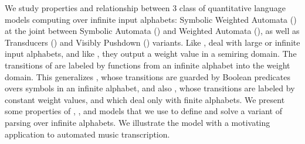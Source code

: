 %
%
We study properties and relationship between 3 class of
quantitative language models computing over infinite input alphabets:
Symbolic Weighted Automata (\SWA)
at the joint between Symbolic Automata (\SA) and Weighted Automata (\WA),
as well as Transducers (\SWT) and Visibly Pushdown (\SWVPA) variants.
%
Like \SA, \SWA deal with large or infinite input alphabets,
and like \WA, they output a weight value in a semiring domain.
The transitions of \SWA are labeled by functions from an infinite alphabet into the weight domain.
This generalizes \SA, whose transitions are guarded by Boolean predicates
overs symbols in an infinite alphabet,
and also \WA, whose transitions are labeled by constant weight values,
and which deal only with finite alphabets.
%
We present some properties of \SWA, \SWT, and \SWVPA models
that we use to define and solve a variant of parsing
over infinite alphabets.
%
We illustrate the model with a motivating application to
automated music transcription.
